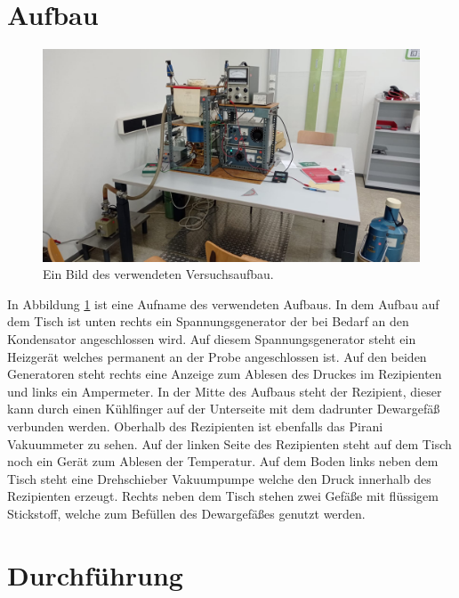 \newpage
\section{Aufbau}
	\begin{figure}
        \centering
        \includegraphics[width = \textwidth]{latex/images/Aufbau.jpeg}
        \caption{Ein Bild des verwendeten Versuchsaufbau.}
        \label{fig:Aufb}
    \end{figure}
    \noindent
    In Abbildung \ref{fig:Aufb} ist  eine Aufname des verwendeten Aufbaus. 
    In dem Aufbau auf dem Tisch ist unten rechts ein Spannungsgenerator der bei Bedarf an den Kondensator angeschlossen wird.
    Auf diesem Spannungsgenerator steht ein Heizgerät welches permanent an der Probe angeschlossen ist.
    Auf den beiden Generatoren steht rechts eine Anzeige zum Ablesen des Druckes im Rezipienten und links ein Ampermeter.
    In der Mitte des Aufbaus steht der Rezipient, dieser kann durch einen Kühlfinger auf der Unterseite mit dem dadrunter Dewargefäß verbunden werden.
    Oberhalb des Rezipienten ist ebenfalls das Pirani Vakuummeter zu sehen.
    Auf der linken Seite des Rezipienten steht auf dem Tisch noch ein Gerät zum Ablesen der Temperatur.
    Auf dem Boden links neben dem Tisch steht eine Drehschieber Vakuumpumpe welche den Druck innerhalb des Rezipienten erzeugt.
    Rechts neben dem Tisch stehen zwei Gefäße mit flüssigem Stickstoff, welche zum Befüllen des Dewargefäßes genutzt werden.
     
\section{Durchführung}

